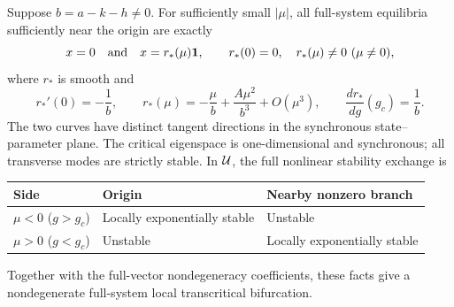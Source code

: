 \begin{theorem}[Nondegenerate transcritical bifurcation at $g_c=a+c$]
\label{thm:P09-transcritical}
Suppose $b=a-k-h\ne0$. For sufficiently small $|\mu|$, all full-system
equilibria sufficiently near the origin are exactly
\begin{equation}
 x=0\quad\hbox{and}\quad x=r_*(\mu)\mathbf{1},\qquad
 r_*(0)=0,\quad r_*(\mu)\ne0\ (\mu\ne0),
 \label{eq:P09-branches}
\end{equation}
where $r_*$ is smooth and
\begin{equation}
 r_*'(0)=-\frac1b,\qquad
 r_*(\mu)=-\frac\mu b+\frac{A\mu^2}{b^3}+O(\mu^3),\qquad
 \frac{dr_*}{dg}(g_c)=\frac1b.
 \label{eq:P09-slopes}
\end{equation}
The two curves have distinct tangent directions in the synchronous
state--parameter plane. The critical eigenspace is one-dimensional and
synchronous; all transverse modes are strictly stable. In $\mathcal{U}$,
the full nonlinear stability exchange is
\begin{center}
\begin{tabular}{@{}lll@{}}
\toprule
Side & Origin & Nearby nonzero branch\\
\midrule
$\mu<0$ ($g>g_c$) & Locally exponentially stable & Unstable\\
$\mu>0$ ($g<g_c$) & Unstable & Locally exponentially stable\\
\bottomrule
\end{tabular}
\end{center}
Together with the full-vector nondegeneracy coefficients, these facts
give a nondegenerate full-system local transcritical bifurcation.
\end{theorem}
